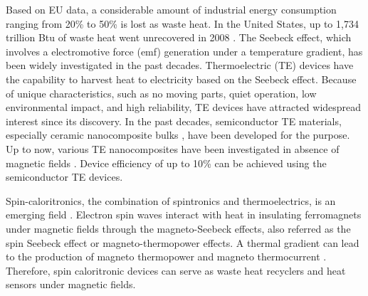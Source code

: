 \documentclass[molecules,review,submit,pdftex,moreauthors]{Definitions/mdpi}
\begin{document}
Based on EU data, a considerable amount of industrial energy consumption ranging from \unit{20}{\%} to \unit{50}{\%} is lost as waste heat.  In the United States, up to 1,734 trillion Btu of waste heat went unrecovered in 2008 \cite{WasteHeat2008}.  The Seebeck effect, which involves a electromotive force (emf) generation under a temperature gradient, has been widely investigated in the past decades.  Thermoelectric (TE) devices have the capability to harvest heat to electricity based on the Seebeck effect.  Because of unique characteristics, such as no moving parts, quiet operation, low environmental impact, and high reliability, TE devices have attracted widespread interest since its discovery.  In the past decades, semiconductor TE materials, especially ceramic nanocomposite bulks \cite{Dresselhaus2007AM,Poudel2008Science,Lan2008APL,Lan2009NL,Lan2010AFM}, have been developed for the purpose.  Up to now, various TE nanocomposites have been investigated in absence of magnetic fields \cite{Liu2012NE,Ren2017Book-TE,Bao2023JMST,Liu2022ML,Mao2018AP,Li2018JMCa,Li2021JMCa,Ren2022MTP,Jia2021MTP,Basu2021MTP,Liu2017MTP,Shuai2017MTP}.  Device efficiency of up to \unit{10}{\%} can be achieved using the semiconductor TE devices.


Spin-caloritronics, the combination of spintronics and thermoelectrics, is an emerging field  \cite{Bauer2012NM,Shan2015PRB}.  Electron spin waves interact with heat in insulating ferromagnets under magnetic fields through the magneto-Seebeck effects, also referred as the spin Seebeck effect or magneto-thermopower effects.   A thermal gradient can lead to the production of magneto thermopower and magneto thermocurrent \cite{Liebing2013APL}.  Therefore, spin caloritronic devices can serve as waste heat recyclers and heat sensors under magnetic fields.   
\end{document}
